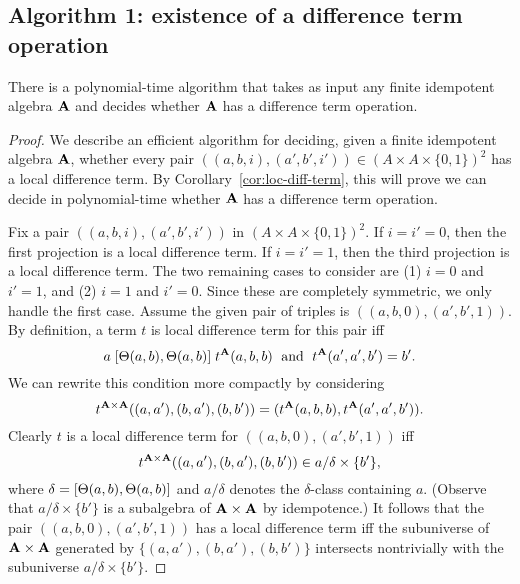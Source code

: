 \draftsecskip

\subsection*{Algorithm 1: existence of a difference term operation}
\begin{cor}
  There is a polynomial-time algorithm that takes as input
  any finite idempotent algebra $\mathbf{A}$ and decides whether
  $\mathbf{A}$ has a difference term operation.
\end{cor}
\begin{proof}
  We describe an efficient algorithm for deciding,
  given a finite idempotent algebra $\mathbf{A}$,
  whether every pair $((a,b,i), (a',b',i')) \in (A\times A \times \{0,1\})^2$ has a local
  difference term.  By Corollary~\ref{cor:loc-diff-term}, this will prove we
  can decide in polynomial-time whether $\mathbf{A}$ has a difference term operation.

  Fix a pair
  $((a,b,i), (a',b',i'))$ in $(A\times A \times \{0,1\})^2$. If $i = i' = 0$,
  then the first projection is a local difference term. If $i = i' = 1$,  
    then the third projection is a local difference term. The two remaining cases to
    consider are (1) $i = 0$ and $i'=1$, and (2)
    $i = 1$ and $i'=0$. Since these are completely symmetric, we only handle the
    first case. Assume  the given pair of triples is
    $((a,b,0), (a',b',1))$.  By definition, a term $t$ is local difference term
    for this pair iff
    \[
    a\mathrel{[\Theta(a,b), \Theta(a,b)]} t^{\mathbf{A}}(a,b,b) \; \text{ and } \;
    t^{\mathbf{A}}(a',a',b') = b'.
    \]
    We can rewrite this condition more compactly by
    considering 
    \[t^{\mathbf{A}\times \mathbf{A}}((a,a'), (b,a'), (b,b')) =
    (t^{\mathbf{A}}(a,b,b),t^{\mathbf{A}}(a',a',b')).\]
    Clearly $t$ is a local difference term for
    $((a,b,0), (a',b',1))$ iff
    \[
    t^{\mathbf{A}\times \mathbf{A}}((a,a'), (b,a'), (b,b'))\in a/\delta \times \{b'\},
    \]
    where $\delta = [\Theta(a,b), \Theta(a,b)]$ and $a/\delta$ denotes the
    $\delta$-class containing $a$.
    (Observe that $a/\delta \times \{b'\}$ is a subalgebra of $\mathbf{A} \times \mathbf{A}$
    by idempotence.)
    It follows that the pair
    $((a,b,0), (a',b',1))$ has a local difference term iff
    the subuniverse of $\mathbf{A}\times \mathbf{A}$ generated by
    $\{(a,a'), (b,a'), (b,b')\}$ intersects nontrivially with the subuniverse
    $a/\delta \times \{b'\}$.


\end{proof}
